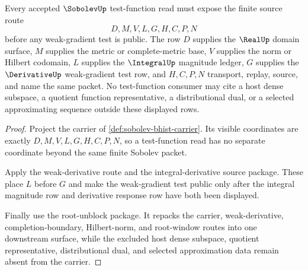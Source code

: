 \begin{theorem}
\label{thm:sobolev-test-function-source}
Every accepted $\SobolevUp$ test-function read must expose the finite source route
$$
D,M,V,L,G,H,C,P,N
$$
before any weak-gradient test is public. The row $D$ supplies the $\RealUp$ domain surface, $M$ supplies the metric or complete-metric base, $V$ supplies the norm or Hilbert codomain, $L$ supplies the $\IntegralUp$ magnitude ledger, $G$ supplies the $\DerivativeUp$ weak-gradient test row, and $H,C,P,N$ transport, replay, source, and name the same packet. No test-function consumer may cite a host dense subspace, a quotient function representative, a distributional dual, or a selected approximating sequence outside these displayed rows.
\end{theorem}
\begin{proof}
Project the carrier of \autoref{def:sobolev-bhist-carrier}. Its visible coordinates are exactly $D,M,V,L,G,H,C,P,N$, so a test-function read has no separate coordinate beyond the same finite Sobolev packet.

Apply the weak-derivative route and the integral-derivative source package. These place $L$ before $G$ and make the weak-gradient test public only after the integral magnitude row and derivative response row have both been displayed.

Finally use the root-unblock package. It repacks the carrier, weak-derivative, completion-boundary, Hilbert-norm, and root-window routes into one downstream surface, while the excluded host dense subspace, quotient representative, distributional dual, and selected approximation data remain absent from the carrier.
\end{proof}

